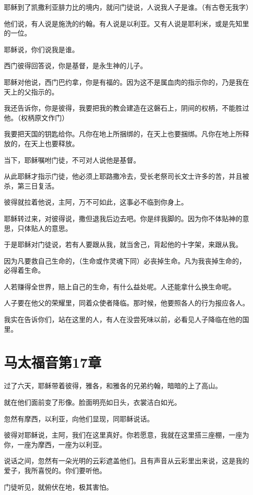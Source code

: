 \documentclass[12pt,oneside]{book}
\begin{document}
耶稣到了凯撒利亚腓力比的境内，就问门徒说，人说我人子是谁。（有古卷无我字）

他们说，有人说是施洗的约翰。有人说是以利亚。又有人说是耶利米，或是先知里的一位。

耶稣说，你们说我是谁。

西门彼得回答说，你是基督，是永生神的儿子。

耶稣对他说，西门巴约拿，你是有福的。因为这不是属血肉的指示你的，乃是我在天上的父指示的。

我还告诉你，你是彼得，我要把我的教会建造在这磐石上，阴间的权柄，不能胜过他。（权柄原文作门）

我要把天国的钥匙给你。凡你在地上所捆绑的，在天上也要捆绑。凡你在地上所释放的，在天上也要释放。

当下，耶稣嘱咐门徒，不可对人说他是基督。

从此耶稣才指示门徒，他必须上耶路撒冷去，受长老祭司长文士许多的苦，并且被杀，第三日复活。

彼得就拉着他说，主阿，万不可如此，这事必不临到你身上。

耶稣转过来，对彼得说，撒但退我后边去吧。你是绊我脚的。因为你不体贴神的意思，只体贴人的意思。

于是耶稣对门徒说，若有人要跟从我，就当舍己，背起他的十字架，来跟从我。

因为凡要救自己生命的，（生命或作灵魂下同）必丧掉生命。凡为我丧掉生命的，必得着生命。

人若赚得全世界，赔上自己的生命，有什么益处呢。人还能拿什么换生命呢。

人子要在他父的荣耀里，同着众使者降临。那时候，他要照各人的行为报应各人。

我实在告诉你们，站在这里的人，有人在没尝死味以前，必看见人子降临在他的国里。

\chapter{马太福音第17章}
过了六天，耶稣带着彼得，雅各，和雅各的兄弟约翰，暗暗的上了高山。

就在他们面前变了形像。脸面明亮如日头，衣裳洁白如光。

忽然有摩西，以利亚，向他们显现，同耶稣说话。

彼得对耶稣说，主阿，我们在这里真好。你若愿意，我就在这里搭三座棚，一座为你，一座为摩西，一座为以利亚。

说话之间，忽然有一朵光明的云彩遮盖他们。且有声音从云彩里出来说，这是我的爱子，我所喜悦的。你们要听他。

门徒听见，就俯伏在地，极其害怕。
\end{document}
